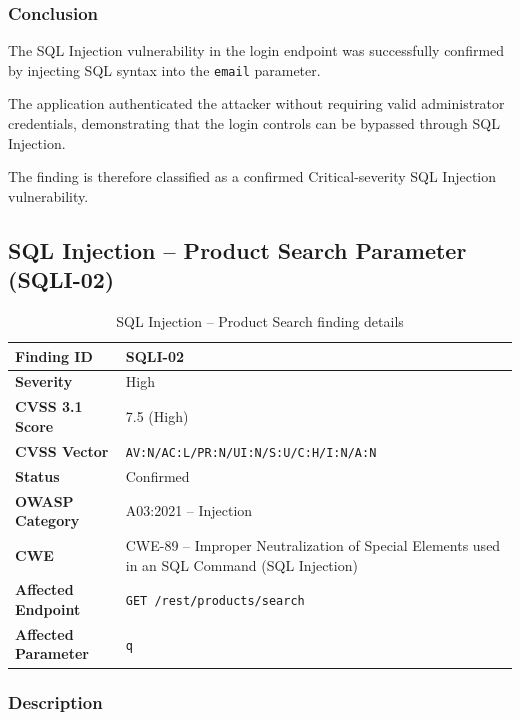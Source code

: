 \subsubsection*{Conclusion}

The SQL Injection vulnerability in the login endpoint was successfully
confirmed by injecting SQL syntax into the \texttt{email} parameter.

The application authenticated the attacker without requiring valid
administrator credentials, demonstrating that the login controls can
be bypassed through SQL Injection.

The finding is therefore classified as a confirmed Critical-severity
SQL Injection vulnerability.



\subsection*{SQL Injection -- Product Search Parameter (SQLI-02)}

\begin{table}[H]
\centering
\begin{tabular}{|l|p{10cm}|}
\hline
\textbf{Finding ID} & SQLI-02 \\
\hline
\textbf{Severity} & High \\
\hline
\textbf{CVSS 3.1 Score} & 7.5 (High) \\
\hline
\textbf{CVSS Vector} & \texttt{AV:N/AC:L/PR:N/UI:N/S:U/C:H/I:N/A:N} \\
\hline
\textbf{Status} & Confirmed \\
\hline
\textbf{OWASP Category} & A03:2021 -- Injection \\
\hline
\textbf{CWE} & CWE-89 -- Improper Neutralization of Special
Elements used in an SQL Command (SQL Injection) \\
\hline
\textbf{Affected Endpoint} & \texttt{GET /rest/products/search} \\
\hline
\textbf{Affected Parameter} & \texttt{q} \\
\hline
\end{tabular}
\caption{SQL Injection -- Product Search finding details}
\end{table}

\subsubsection*{Description}

